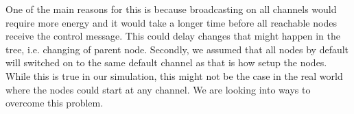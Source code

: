One of the main reasons for this is because broadcasting on all channels would require more energy and it would take a longer time before all reachable nodes receive the control message. This could delay changes that might happen in the tree, i.e. changing of parent node. Secondly, we assumed that all nodes by default will switched on to the same default channel as that is how setup the nodes. While this is true in our simulation, this might not be the case in the real world where the nodes could start at any channel. We are looking into ways to overcome this problem.

